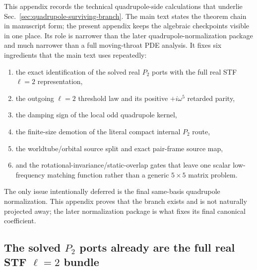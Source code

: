 \documentclass[11pt]{article}
\begin{document}
This appendix records the technical quadrupole-side calculations that underlie
Sec.~\ref{sec:quadrupole-surviving-branch}.  The main text states the theorem
chain in manuscript form; the present appendix keeps the algebraic checkpoints
visible in one place.  Its role is narrower than the later
quadrupole-normalization package and much narrower than a full moving-throat PDE
analysis.  It fixes six ingredients that the main text uses repeatedly:
\begin{enumerate}
  \item the exact identification of the solved real $P_2$ ports with the full
  real STF $\ell=2$ representation,
  \item the outgoing $\ell=2$ threshold law and its positive
  $+i\omega^5$ retarded parity,
  \item the damping sign of the local odd quadrupole kernel,
  \item the finite-size demotion of the literal compact internal $P_2$ route,
  \item the worldtube/orbital source split and exact pair-frame source map,
  \item and the rotational-invariance/static-overlap gates that leave one
  scalar low-frequency matching function rather than a generic $5\times5$
  matrix problem.
\end{enumerate}
The only issue intentionally deferred is the final same-basis quadrupole
normalization.  This appendix proves that the branch exists and is not
naturally projected away; the later normalization package is what fixes its
final canonical coefficient.

\subsection{The solved \texorpdfstring{$P_2$}{P\_2} ports already are the full real STF \texorpdfstring{$\ell=2$}{ell=2} bundle}
\label{app:quad-ledger-representation}
\end{document}
